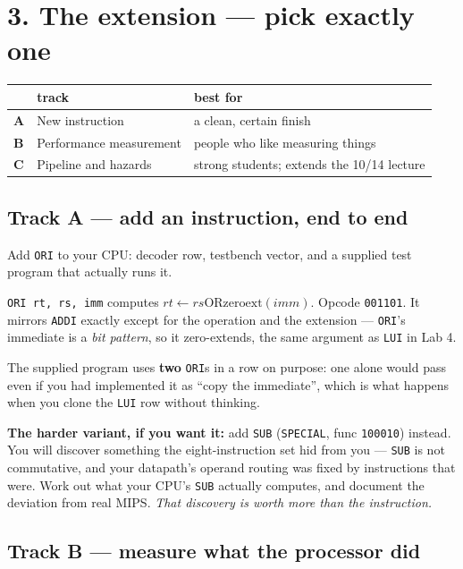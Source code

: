 \documentclass[11pt]{article}
\newcommand{\code}[1]{\texttt{#1}}
\begin{document}
\section*{3. The extension --- pick exactly one}

\begin{center}
\begin{tabular}{llp{6.2cm}}
\toprule
& track & best for \\
\midrule
\textbf{A} & New instruction & a clean, certain finish \\
\textbf{B} & Performance measurement & people who like measuring things \\
\textbf{C} & Pipeline and hazards & strong students; extends the 10/14 lecture \\
\bottomrule
\end{tabular}
\end{center}

\subsection*{Track A --- add an instruction, end to end}

Add \code{ORI} to your CPU: decoder row, testbench vector, and a supplied test
program that actually runs it.

\code{ORI rt, rs, imm} computes $rt \leftarrow rs \mathbin{\mathrm{OR}}
\mathrm{zeroext}(imm)$. Opcode \code{001101}. It mirrors \code{ADDI} exactly
except for the operation and the extension --- \code{ORI}'s immediate is a
\emph{bit pattern}, so it zero-extends, the same argument as \code{LUI} in Lab 4.

The supplied program uses \textbf{two} \code{ORI}s in a row on purpose: one alone
would pass even if you had implemented it as ``copy the immediate'', which is what
happens when you clone the \code{LUI} row without thinking.

\textbf{The harder variant, if you want it:} add \code{SUB} (\code{SPECIAL},
func \code{100010}) instead. You will discover something the eight-instruction set
hid from you --- \code{SUB} is not commutative, and your datapath's operand
routing was fixed by instructions that were. Work out what your CPU's \code{SUB}
actually computes, and document the deviation from real MIPS. \emph{That
discovery is worth more than the instruction.}

\subsection*{Track B --- measure what the processor did}
\end{document}
